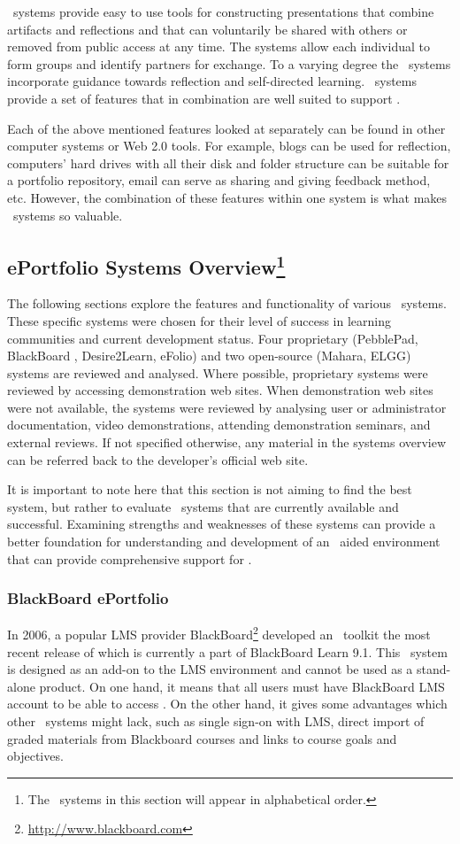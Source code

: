 \ep~systems provide easy to use tools for constructing presentations that
combine artifacts and reflections and that can voluntarily be shared with others
or removed from public access at any time. The systems allow each individual to
form groups and identify partners for exchange. To a varying degree the
\ep~systems incorporate guidance towards reflection and self-directed learning.
\ep~systems provide a set of features that in combination are well suited to
support \LLLsn.

Each of the above mentioned features looked at separately can be found in other
computer systems or Web 2.0 tools. For example, blogs can be used for
reflection, computers' hard drives with all their disk and folder structure can
be suitable for a portfolio repository, email can serve as sharing and giving
feedback method, etc. However, the combination of these features within one
system is what makes \ep~systems so valuable.

\subsection[ePortfolio Systems Overview]{ePortfolio Systems
Overview\footnote{The \ep~systems in this section will appear in alphabetical
order.}} 
The following sections explore the features and functionality of various
\ep~systems. These specific systems were chosen for their level of success in
learning communities and current development status. Four proprietary
(PebblePad, BlackBoard \ep, Desire2Learn, eFolio) and two open-source (Mahara,
ELGG) systems are reviewed and analysed. Where possible, proprietary systems
were reviewed by accessing demonstration web sites. When demonstration web
sites were not available, the systems were reviewed by analysing user or
administrator documentation, video demonstrations, attending demonstration
seminars, and external reviews. If not specified otherwise, any material in
the systems overview can be referred back to the developer's official web site.

It is important to note here that this section is not aiming to find the best
system, but rather to evaluate \ep~systems that are currently available and
successful. Examining strengths and weaknesses of these systems can provide a
better foundation for understanding and development of an \ep~aided environment
that can provide comprehensive support for \LLLsn.

\subsubsection{BlackBoard ePortfolio}
In 2006, a popular LMS provider
BlackBoard\footnote{\url{http://www.blackboard.com}} developed an \ep~toolkit
the most recent release of which is currently a part of BlackBoard Learn 9.1.
This \ep~system is designed as an add-on to the LMS environment and cannot be
used as a stand-alone product. On one hand, it means that all users must have
BlackBoard LMS account to be able to access \ep. On the other hand, it gives
some advantages which other \ep~systems might lack, such as single sign-on with
LMS, direct import of graded materials from Blackboard courses and links to
course goals and objectives.

